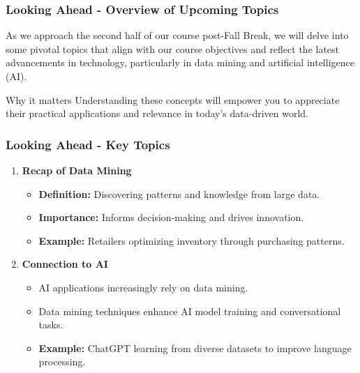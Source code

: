 \documentclass[aspectratio=169]{beamer}
\begin{document}
\begin{frame}[fragile]
    \frametitle{Looking Ahead - Overview of Upcoming Topics}
    As we approach the second half of our course post-Fall Break, we will delve into some pivotal topics that align with our course objectives and reflect the latest advancements in technology, particularly in data mining and artificial intelligence (AI).
    
    \begin{block}{Why it matters}
        Understanding these concepts will empower you to appreciate their practical applications and relevance in today’s data-driven world.
    \end{block}
\end{frame}

\begin{frame}[fragile]
    \frametitle{Looking Ahead - Key Topics}
    \begin{enumerate}
        \item \textbf{Recap of Data Mining}
        \begin{itemize}
            \item \textbf{Definition:} Discovering patterns and knowledge from large data.
            \item \textbf{Importance:} Informs decision-making and drives innovation.
            \item \textbf{Example:} Retailers optimizing inventory through purchasing patterns.
        \end{itemize}
        
        \item \textbf{Connection to AI}
        \begin{itemize}
            \item AI applications increasingly rely on data mining.
            \item Data mining techniques enhance AI model training and conversational tasks.
            \item \textbf{Example:} ChatGPT learning from diverse datasets to improve language processing.
        \end{itemize}
    \end{enumerate}
\end{frame}
\end{document}
